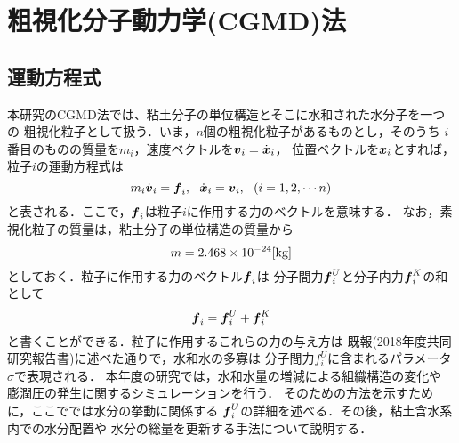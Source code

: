 ﻿%
\section{粗視化分子動力学(CGMD)法}
\subsection{運動方程式}
本研究のCGMD法では、粘土分子の単位構造とそこに水和された水分子を一つの
粗視化粒子として扱う．いま，$n$個の粗視化粒子があるものとし，そのうち
$i$番目のものの質量を$m_i$，速度ベクトルを$\mbox{\boldmath $v$}_i=\dot{\mbox{\boldmath $x$}}_i$，
位置ベクトルを$\mbox{\boldmath $x$}_i$とすれば，粒子$i$の運動方程式は
\begin{equation}
	m_i \dot {\fat{v}}_i =\fat{f}_i ,\ \ 
	\dot{\fat{x}}_i = \fat{v}_i, \ \ ( i =1,2,\cdots n )
	\label{eqn:eq_mot}
\end{equation}
と表される．ここで，$\mbox{\boldmath $f$}_i$は粒子$i$に作用する力のベクトルを意味する．
なお，素視化粒子の質量は，粘土分子の単位構造の質量から
\begin{equation}
	m=2.468\times 10 ^{-24}[{\rm kg}]
	\label{eqn:mass}
\end{equation}
としておく．粒子に作用する力のベクトル$\mbox{\boldmath $f$}_i$は
分子間力$\mbox{\boldmath $f$}_i^{U}$と分子内力$\mbox{\boldmath $f$}_i^{K}$の和として
\begin{equation}
	\mbox{\boldmath $f$}_i=\mbox{\boldmath $f$}_i^U+\mbox{\boldmath $f$}_i^K
	\label{eqn:f_tot}
\end{equation}
と書くことができる．粒子に作用するこれらの力の与え方は
既報(2018年度共同研究報告書)に述べた通りで，水和水の多寡は
分子間力$f_i^U$に含まれるパラメータ$\sigma$で表現される．
本年度の研究では，水和水量の増減による組織構造の変化や
膨潤圧の発生に関するシミュレーションを行う．
そのための方法を示すために，ここででは水分の挙動に関係する
$\mbox{\boldmath $f$}_i^U$の詳細を述べる．その後，粘土含水系内での水分配置や
水分の総量を更新する手法について説明する．\\

